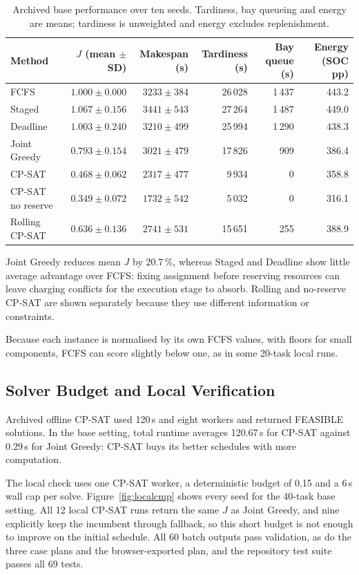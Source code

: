 \documentclass[11pt,a4paper]{article}
\newcommand{\pct}{\,\%}
\begin{document}
\begin{table}[!htbp]
\centering\small
\caption{Archived base performance over ten seeds. Tardiness, bay queueing and energy are means;
tardiness is unweighted and energy excludes replenishment.}
\label{tab:archived}
\begin{tabular}{lrrrrr}
\toprule
Method & $J$ (mean $\pm$ SD) & Makespan (s) & Tardiness (s) & Bay queue (s) & Energy (SOC pp) \\
\midrule
FCFS & $1.000 \pm 0.000$ & $3233 \pm 384$ & 26\,028 & 1\,437 & 443.2 \\
Staged & $1.067 \pm 0.156$ & $3441 \pm 543$ & 27\,264 & 1\,487 & 449.0 \\
Deadline & $1.003 \pm 0.240$ & $3210 \pm 499$ & 25\,994 & 1\,290 & 438.3 \\
Joint Greedy & $0.793 \pm 0.154$ & $3021 \pm 479$ & 17\,826 & 909 & 386.4 \\
CP-SAT & $0.468 \pm 0.062$ & $2317 \pm 477$ & 9\,934 & 0 & 358.8 \\
CP-SAT no reserve & $0.349 \pm 0.072$ & $1732 \pm 542$ & 5\,032 & 0 & 316.1 \\
Rolling CP-SAT & $0.636 \pm 0.136$ & $2741 \pm 531$ & 15\,651 & 255 & 388.9 \\
\bottomrule
\end{tabular}
\end{table}

Joint Greedy reduces mean $J$ by 20.7\pct, whereas Staged and Deadline show little average advantage over
FCFS: fixing assignment before reserving resources can leave charging conflicts for the execution stage
to absorb. Rolling and no-reserve CP-SAT are shown separately because they use different information or
constraints.

Because each instance is normalised by its own FCFS values, with floors for small components, FCFS can
score slightly below one, as in some 20-task local runs.

\subsection{Solver Budget and Local Verification}

Archived offline CP-SAT used 120\,s and eight workers and returned FEASIBLE solutions. In the base
setting, total runtime averages 120.67\,s for CP-SAT against 0.29\,s for Joint Greedy: CP-SAT buys its
better schedules with more computation.

The local check uses one CP-SAT worker, a deterministic budget of 0.15 and a 6\,s wall cap per solve.
Figure~\ref{fig:localcmp} shows every seed for the 40-task base setting. All 12 local CP-SAT runs return
the same $J$ as Joint Greedy, and nine explicitly keep the incumbent through fallback, so this short budget
is not enough to improve on the initial schedule. All 60 batch outputs pass validation, as do
the three case plans and the browser-exported plan, and the repository test suite passes all 69 tests.
\end{document}
